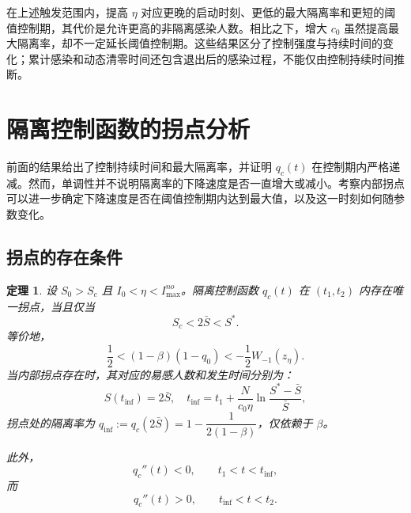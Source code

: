 \documentclass[UTF8,a4paper,10pt,fontset=fandol]{ctexart}
\theoremstyle{cnplain}
\newtheorem{theorem}{定理}[section]
\theoremstyle{remark}
\newcommand{\qinf}{q_{\mathrm{inf}}}
\numberwithin{equation}{section}
\begin{document}
在上述触发范围内，提高 $\eta$ 对应更晚的启动时刻、更低的最大隔离率和更短的阈值控制期，其代价是允许更高的非隔离感染人数。相比之下，增大 $c_0$ 虽然提高最大隔离率，却不一定延长阈值控制期。这些结果区分了控制强度与持续时间的变化；累计感染和动态清零时间还包含退出后的感染过程，不能仅由控制持续时间推断。

\section{隔离控制函数的拐点分析}
\label{sec:s1:shape}
前面的结果给出了控制持续时间和最大隔离率，并证明 $q_c(t)$ 在控制期内严格递减。然而，单调性并不说明隔离率的下降速度是否一直增大或减小。考察内部拐点可以进一步确定下降速度是否在阈值控制期内达到最大值，以及这一时刻如何随参数变化。

\subsection{拐点的存在条件}
\begin{theorem}\label{thm:s1:inflection}
    设 $S_0>S_c$ 且 $I_0<\eta<I_{\max}^{no}$。隔离控制函数 $q_c(t)$ 在 $(t_1,t_2)$ 内存在唯一拐点，当且仅当
    \[
    S_c<2\bar S<S^*.
    \]
    等价地，
    \[
    \frac{1}{2}
    <(1-\beta)(1-q_0)
    <-\frac{1}{2}W_{-1}(z_\eta).
    \]
    当内部拐点存在时，其对应的易感人数和发生时间分别为：
    \[
    S(t_{\mathrm{inf}})=2\bar S,\quad
    t_{\mathrm{inf}}
    =
    t_1+\frac{N}{c_0\eta}\ln\frac{S^*-\bar S}{\bar S},
    \]
    拐点处的隔离率为 $\qinf:=q_c(2\bar S)=1-\dfrac{1}{2(1-\beta)}$，仅依赖于 $\beta$。

    此外，
    \[
    q_c''(t)<0,
    \qquad t_1<t<t_{\mathrm{inf}},
    \]
    而
    \[
    q_c''(t)>0,
    \qquad t_{\mathrm{inf}}<t<t_2.
    \]
\end{theorem}
\end{document}
